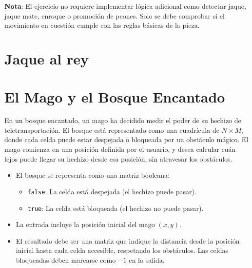 \textbf{Nota}: El ejercicio no requiere implementar lógica adicional como detectar jaque, jaque mate, enroque o promoción de peones. Solo se debe comprobar si el movimiento en cuestión cumple con las reglas básicas de la pieza.

\section{Jaque al rey}


\section{El Mago y el Bosque Encantado}
En un bosque encantado, un mago ha decidido medir el poder de su hechizo de teletransportación. El bosque está representado como una cuadrícula de \(N \times M\), donde cada celda puede estar despejada o bloqueada por un obstáculo mágico. El mago comienza en una posición definida por el usuario, y desea calcular cuán lejos puede llegar su hechizo desde esa posición, sin atravesar los obstáculos.
\begin{itemize}
    \item El bosque se representa como una matriz booleana: 
    \begin{itemize}
        \item \texttt{false}: La celda está despejada (el hechizo puede pasar).  
        \item \texttt{true}: La celda está bloqueada (el hechizo no puede pasar).  
    \end{itemize}
    \item La entrada incluye la posición inicial del mago \((x, y)\).  
    \item El resultado debe ser una matriz que indique la distancia desde la posición inicial hasta cada celda accesible, respetando los obstáculos. Las celdas bloqueadas deben marcarse como \(-1\) en la salida.  
\end{itemize}

